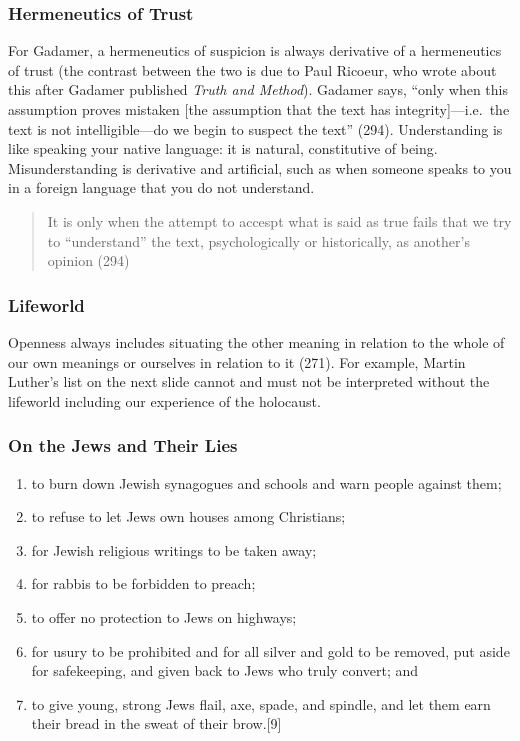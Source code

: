 \documentclass[xcolor=dvipsnames]{beamer}
\begin{document}
\begin{frame}
  \frametitle{Hermeneutics of Trust}
  For Gadamer, a hermeneutics of suspicion is always derivative of a
  hermeneutics of trust (the contrast between the two is due to Paul
  Ricoeur, who wrote about this after Gadamer published \emph{Truth
    and Method}). Gadamer says, ``only when this assumption proves
  mistaken [the assumption that the text has integrity]---i.e.\ the
  text is not intelligible---do we begin to suspect the text'' (294).
  Understanding is like speaking your native language: it is natural,
  constitutive of being. Misunderstanding is derivative and
  artificial, such as when someone speaks to you in a foreign language
  that you do not understand.
  \begin{quote}
    It is only when the attempt to accespt what is said as true fails
    that we try to ``understand'' the text, psychologically or
    historically, as another's opinion (294)
  \end{quote}
\end{frame}

\begin{frame}
  \frametitle{Lifeworld}
  Openness always includes situating the other meaning in relation to
  the whole of our own meanings or ourselves in relation to it (271).
  For example, Martin Luther's list on the next slide cannot and must
  not be interpreted without the lifeworld including our experience of
  the holocaust.
\end{frame}

\begin{frame}
  \frametitle{On the Jews and Their Lies}
  \begin{enumerate}
  \item to burn down Jewish synagogues and schools and warn people
    against them;
  \item to refuse to let Jews own houses among Christians;
  \item for Jewish religious writings to be taken away;
  \item for rabbis to be forbidden to preach;
  \item to offer no protection to Jews on highways;
  \item for usury to be prohibited and for all silver and gold to be
    removed, put aside for safekeeping, and given back to Jews who
    truly convert; and
  \item to give young, strong Jews flail, axe, spade, and spindle, and let them earn their bread in the sweat of their brow.[9]
  \end{enumerate}
\end{frame}
\end{document}
